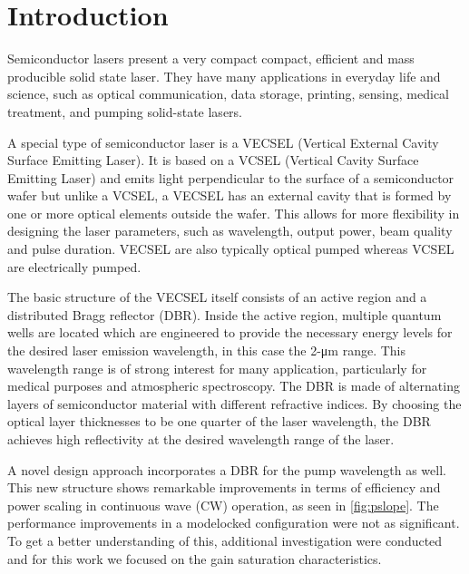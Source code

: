 \chapter{Introduction}\label{chapter:introduction}

Semiconductor lasers present a very compact compact, efficient and mass producible solid state laser. They have many applications in everyday life and science, such as optical communication, data storage, printing, sensing, medical treatment, and pumping solid-state lasers.

A special type of semiconductor laser is a VECSEL (Vertical External Cavity Surface Emitting Laser). It is based on a VCSEL (Vertical Cavity Surface Emitting Laser) and emits light perpendicular to the surface of a semiconductor wafer but unlike a VCSEL, a VECSEL has an external cavity that is formed by one or more optical elements outside the wafer. This allows for more flexibility in designing the laser parameters, such as wavelength, output power, beam quality and pulse duration. VECSEL are also typically optical pumped whereas VCSEL are electrically pumped.

The basic structure of the VECSEL itself consists of an active region and a distributed Bragg reflector (DBR). Inside the active region, multiple quantum wells are located which are engineered to provide the necessary energy levels for the desired laser emission wavelength, in this case the 2-\unit{\um} range. This wavelength range is of strong interest for many application, particularly for medical purposes and atmospheric spectroscopy. The DBR is made of alternating layers of semiconductor material with different refractive indices. By choosing the optical layer thicknesses to be one quarter of the laser wavelength, the DBR achieves high reflectivity at the desired wavelength range of the laser. 

A novel design approach incorporates a DBR for the pump wavelength as well. This new structure shows remarkable improvements in terms of efficiency and power scaling in continuous wave (CW) operation, as seen in \cref{fig:pslope}. The performance improvements in a modelocked configuration were not as significant. To get a better understanding of this, additional investigation were conducted and for this work we focused on the gain saturation characteristics.

